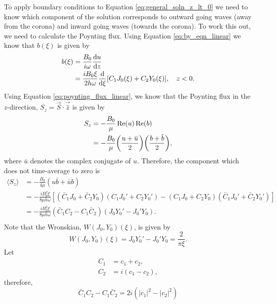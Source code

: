 To apply boundary conditions to Equation \eqref{eq:general_soln_z_lt_0} we need to know which component of the solution corresponds to outward going waves (away from the corona) and inward going waves (towards the corona). To work this out, we need to calculate the Poynting flux. Using Equation \eqref{eq:by_eqn_linear} we know that $b(\xi)$ is given by
\begin{equation}
    \begin{aligned}
    b(\xi) &= \frac{B_0}{i\omega}\dv{u}{z} \\
    &= \frac{iB_0\xi}{2h\omega}\dv{}{\xi}\qty[C_1J_0(\xi) + C_2Y_0(\xi)],\quad z<0.
    \end{aligned}
\end{equation}
Using Equation \eqref{eq:poynting_flux_linear}, we know that the Poynting flux in the $z$-direction, $S_z=\vec{S}\cdot\vec{\hat{z}}$ is given by
\begin{equation}
    \label{eq:poynting_flux_chap_2}
    \begin{aligned}
    S_z&=-\frac{B_0}{\mu}\Re(u)\Re(b) \\
    &=-\frac{B_0}{\mu}\qty(\frac{u+\bar{u}}{2})\qty(\frac{b+\bar{b}}{2}),
    \end{aligned}
\end{equation}
where $\bar{u}$ denotes the complex conjugate of $u$.
Therefore, the component which does not time-average to zero is
\[
    \begin{aligned}
    \langle S_z\rangle &= -\frac{B_0}{4\mu}(u\bar{b} + \bar{u}b) \\
    &=-\frac{iB_0^2\xi}{8\mu h\omega}[(\bar{C}_1J_0+\bar{C}_2Y_0)(C_1J_0'+C_2Y_0')-(C_1J_0+C_2Y_0)(\bar{C}_1J_0'+\bar{C}_2Y_0')]\\
    &=-\frac{iB_0^2\xi}{8\mu h\omega}(\bar{C}_1C_2-C_1\bar{C}_2)(J_0Y_0'-J_0'Y_0).\\
    \end{aligned}
\]
Note that the Wronskian, $W(J_0,Y_0)(\xi)$, is given by
\begin{equation}
    \label{eq:wronskian_j0_y0}
    W(J_0,Y_0)(\xi) = J_0Y_0'-J_0'Y_0 = \frac{2}{\pi \xi}.
\end{equation}
Let
\begin{equation}
    \begin{aligned}
        C_1 &= c_1 + c_2, \\
        C_2 &= i(c_1 - c_2),
    \end{aligned}
\end{equation}
therefore,
\[\bar{C}_1C_2-C_1\bar{C}_2=2i(|c_1|^2-|c_2|^2)\]
